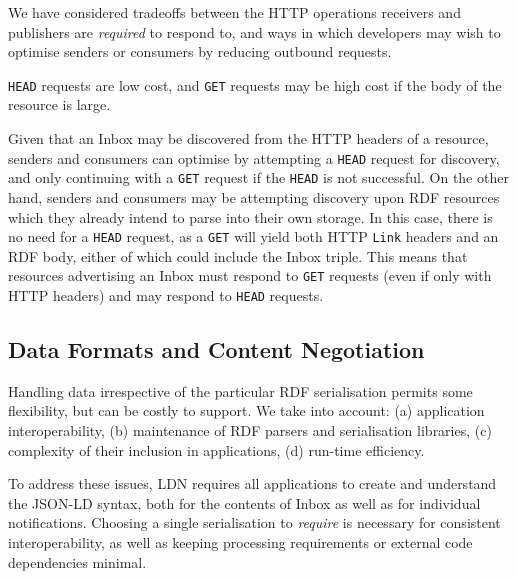 \documentclass[a4paper]{llncs}
\begin{document}
\par We have considered tradeoffs between the HTTP operations receivers and publishers are {\em required} to respond to, and ways in which developers may wish to optimise senders or consumers by reducing outbound requests.


\par

                                        {\tt HEAD} requests are low cost, and {\tt GET} requests may be high cost if the body of the resource is large.

                                        Given that an Inbox may be discovered from the HTTP headers of a resource, senders and consumers can optimise by attempting a {\tt HEAD} request for discovery, and only continuing with a {\tt GET} request if the {\tt HEAD} is not successful. On the other hand, senders and consumers may be attempting discovery upon RDF resources which they already intend to parse into their own storage. In this case, there is no need for a {\tt HEAD} request, as a {\tt GET} will yield both HTTP {\tt Link} headers and an RDF body, either of which could include the Inbox triple. This means that resources advertising an Inbox must respond to {\tt GET} requests (even if only with HTTP headers) and may respond to {\tt HEAD} requests.





                                \subsection{Data Formats and Content Negotiation}
  \label{data-formats}



\par Handling data irrespective of the particular RDF serialisation permits some flexibility, but can be costly to support. We take into account: (a) application interoperability, (b) maintenance of RDF parsers and serialisation libraries, (c) complexity of their inclusion in applications, (d) run-time efficiency.


\par

                                        To address these issues, LDN requires all applications to create and understand the JSON-LD syntax, both for the contents of Inbox as well as for individual notifications. Choosing a single serialisation to {\em require} is necessary for consistent interoperability, as well as keeping processing requirements or external code dependencies minimal.
\end{document}

